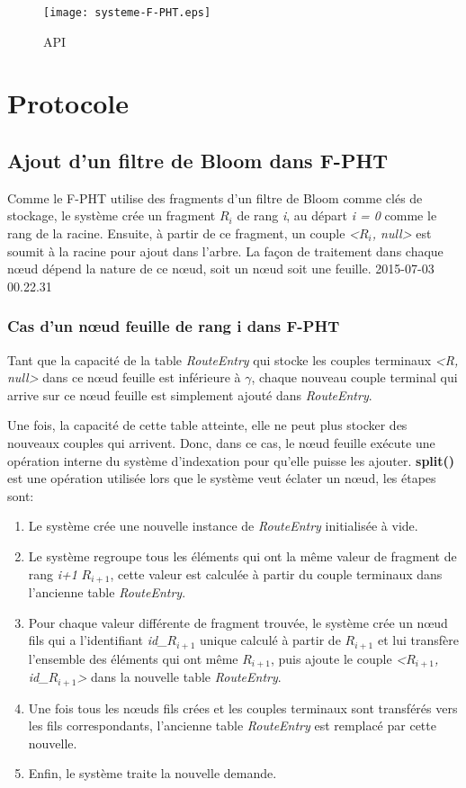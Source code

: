 \documentclass[a4paper,11pt]{report}
\begin{document}
	\begin{figure}[!htbp]
	\centering
	\texttt{[image: systeme-F-PHT.eps]}
	\caption{API}
	\label{systeme-F-PHT}
	\end{figure}	
	
	\newpage
	
	
\chapter{Protocole}
\section{Ajout d'un filtre de Bloom dans F-PHT}
	Comme le F-PHT utilise des fragments d'un filtre de Bloom comme clés de stockage, le système crée un fragment \textit{$R_i$} de rang \textit{i}, au départ \textit{i = 0} comme le rang de la racine. Ensuite, à partir de ce fragment, un couple \textit{<$R_i$, null>} est soumit à la racine pour ajout dans l'arbre. La façon de traitement dans chaque nœud dépend la nature de ce nœud, soit un nœud soit une feuille.
2015-07-03 00.22.31
\subsection{Cas d'un nœud feuille de rang i dans F-PHT}
	Tant que la capacité de la table \textit{RouteEntry} qui stocke les couples terminaux \textit{<R, null>} dans ce nœud feuille est inférieure à $\gamma$, chaque nouveau couple terminal qui arrive sur ce nœud feuille est simplement ajouté dans \textit{RouteEntry}.

	Une fois, la capacité de cette table atteinte, elle ne peut plus stocker des nouveaux couples qui arrivent. Donc, dans ce cas, le nœud feuille exécute une opération interne du système d'indexation pour qu'elle puisse les ajouter. \textbf{split()} est une opération utilisée lors que le système veut éclater un nœud, les étapes sont:
	\begin{enumerate}
		\item Le système crée une nouvelle instance de \textit{RouteEntry} initialisée à vide.
		\item Le système regroupe tous les éléments qui ont la même valeur de fragment de rang \textit{i+1} \textit{$R_{i+1}$}, cette valeur est calculée à partir du couple terminaux dans l'ancienne table \textit{RouteEntry}.
		\item Pour chaque valeur différente de fragment trouvée, le système crée un nœud fils qui a l'identifiant \textit{id\_$R_{i+1}$} unique calculé à partir de \textit{$R_{i+1}$} et lui transfère l'ensemble des éléments qui ont même \textit{$R_{i+1}$}, puis ajoute le couple \textit{<$R_{i+1}$, id\_$R_{i+1}$>} dans la nouvelle table \textit{RouteEntry}.
		\item Une fois tous les nœuds fils crées et les couples terminaux sont transférés vers les fils correspondants, l'ancienne table \textit{RouteEntry} est remplacé par cette nouvelle.
		\item Enfin, le système traite la nouvelle demande.
	\end{enumerate}
	
\end{document}
